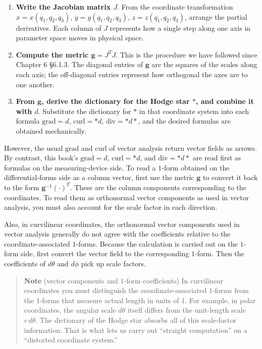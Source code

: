 \begin{enumerate}
\def\labelenumi{\arabic{enumi}.}
\item
  \textbf{Write the Jacobian matrix $J$}. From the coordinate
  transformation \(x = x(q_1,q_2,q_3)\), \(y = y(q_1,q_2,q_3)\),
  \(z = z(q_1,q_2,q_3)\), arrange the partial derivatives. Each column
  of \(J\) represents how a single step along one axis in parameter
  space moves in physical space.
\item
  \textbf{Compute the metric $\mathbf{g} = J^T J$}. This is the
  procedure we have followed since Chapter 6 §6.1.3. The diagonal
  entries of \(\mathbf{g}\) are the squares of the scales along each
  axis; the off-diagonal entries represent how orthogonal the axes are
  to one another.
\item
  \textbf{From $\mathbf{g}$, derive the dictionary for the Hodge star $\ast$, and combine it with $d$}.
  Substitute the dictionary for \(\ast\) in that coordinate system into
  each formula \(\mathrm{grad} = d\), \(\mathrm{curl}=\ast d\),
  \(\mathrm{div}=\ast d\ast\), and the desired formulas are obtained
  mechanically.
\end{enumerate}

However, the usual \(\mathrm{grad}\) and \(\mathrm{curl}\) of vector
analysis return vector fields as arrows. By contrast, this book's
\(\mathrm{grad}=d\), \(\mathrm{curl}=\ast d\), and
\(\mathrm{div}=\ast d\ast\) are read first as formulas on the
measuring-device side. To read a \(1\)-form obtained on the
differential-forms side as a column vector, first use the metric
\(\mathbf{g}\) to convert it back to the form
\(\mathbf{g}^{-1}(\cdot)^T\). These are the column components
corresponding to the coordinates. To read them as orthonormal vector
components as used in vector analysis, you must also account for the
scale factor in each direction.

Also, in curvilinear coordinates, the orthonormal vector components used
in vector analysis generally do not agree with the coefficients relative
to the coordinate-associated \(1\)-forms. Because the calculation is
carried out on the \(1\)-form side, first convert the vector field to
the corresponding \(1\)-form. Then the coefficients of \(d\theta\) and
\(d\phi\) pick up scale factors.

\begin{quote}
\textbf{Note} (vector components and \(1\)-form coefficients) In
curvilinear coordinates you must distinguish the coordinate-associated
\(1\)-forms from the \(1\)-forms that measure actual length in units of
1. For example, in polar coordinates, the angular scale \(d\theta\)
itself differs from the unit-length scale \(r\,d\theta\). The dictionary
of the Hodge star absorbs all of this scale-factor information. That is
what lets us carry out ``straight computation'' on a ``distorted
coordinate system.''
\end{quote}

